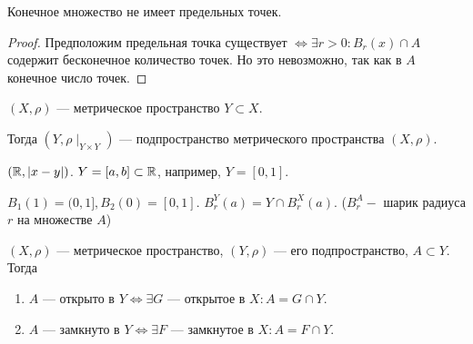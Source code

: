 \begin{consequence}
     Конечное множество не имеет предельных точек.
\end{consequence}
\begin{proof}
     Предположим предельная точка существует $\iff \exists r > 0\!: B_r(x) \cap A$ содержит бесконечное количество точек. Но это невозможно, так как в $A$ конечное число точек.
\end{proof}

\begin{definition}
     $(X, \rho)$ --- метрическое пространство  $Y \subset X$.

     Тогда  $(Y, \rho \mid_{Y \times Y})$ --- подпространство метрического пространства  $(X, \rho)$.
\end{definition}
\begin{example}
     $(\mathbb{R}, |x-y|)$.  $Y=[a, b] \subset \mathbb{R}$, например, $Y=[0, 1]$.

      $B_1(1) = (0, 1], B_2(0) = [0, 1]$.  $B_r^Y(a) = Y \cap B_r^X(a)$. ($B^A_r -$ шарик радиуса $r$ на множестве $A$)
\end{example}
\begin{theorem}
     $(X, \rho)$ --- метрическое пространство,  $(Y, \rho)$ --- его подпространство,  $A \subset Y$. Тогда
      \begin{enumerate}
          \item $A$ --- открыто в  $Y \iff \exists G$ --- открытое в  $X\!: A = G \cap Y$. 
          \item $A$ --- замкнуто в  $Y \iff \exists F$ --- замкнутое в  $X\!: A = F \cap Y$.
     \end{enumerate}
\end{theorem}
